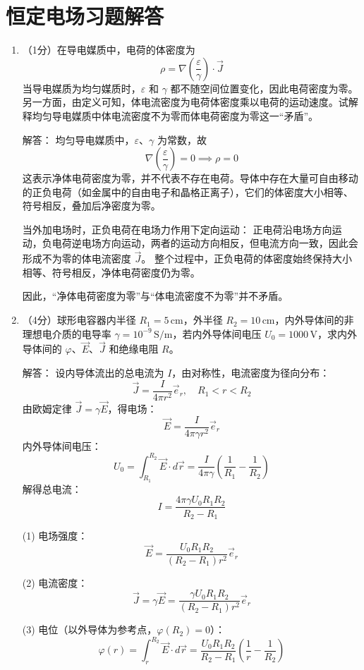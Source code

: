 \section{恒定电场习题解答}

\begin{enumerate}

\item （1分）在导电媒质中，电荷的体密度为
\[
\rho = \nabla\left(\frac{\varepsilon}{\gamma}\right)\cdot\vec{J}
\]
当导电媒质为均匀媒质时，$\varepsilon$ 和 $\gamma$ 都不随空间位置变化，因此电荷密度为零。另一方面，由定义可知，体电流密度为电荷体密度乘以电荷的运动速度。试解释均匀导电媒质中体电流密度不为零而体电荷密度为零这一“矛盾”。

解答：
均匀导电媒质中，$\varepsilon$、$\gamma$ 为常数，故
\[
\nabla\left(\frac{\varepsilon}{\gamma}\right)=0\implies\rho=0
\]
这表示净体电荷密度为零，并不代表不存在电荷。导体中存在大量可自由移动的正负电荷（如金属中的自由电子和晶格正离子），它们的体密度大小相等、符号相反，叠加后净密度为零。

当外加电场时，正负电荷在电场力作用下定向运动：
正电荷沿电场方向运动，负电荷逆电场方向运动，两者的运动方向相反，但电流方向一致，因此会形成不为零的体电流密度 $\vec{J}$。
整个过程中，正负电荷的体密度始终保持大小相等、符号相反，净体电荷密度仍为零。

因此，“净体电荷密度为零”与“体电流密度不为零”并不矛盾。

\item （4分）球形电容器内半径 $R_1=5\,\text{cm}$，外半径 $R_2=10\,\text{cm}$，内外导体间的非理想电介质的电导率 $\gamma=10^{-9}\,\text{S/m}$，若内外导体间电压 $U_0=1000\,\text{V}$，求内外导体间的 $\varphi$、$\vec{E}$、$\vec{J}$ 和绝缘电阻 $R$。

解答：
设内导体流出的总电流为 $I$，由对称性，电流密度为径向分布：
\[
\vec{J} = \frac{I}{4\pi r^2}\vec{e}_r,\quad R_1<r<R_2
\]
由欧姆定律 $\vec{J}=\gamma\vec{E}$，得电场：
\[
\vec{E} = \frac{I}{4\pi\gamma r^2}\vec{e}_r
\]
内外导体间电压：
\[
U_0 = \int_{R_1}^{R_2} \vec{E}\cdot d\vec{r} = \frac{I}{4\pi\gamma}\left(\frac{1}{R_1}-\frac{1}{R_2}\right)
\]
解得总电流：
\[
I = \frac{4\pi\gamma U_0 R_1 R_2}{R_2-R_1}
\]

(1) 电场强度：
\[
\vec{E} = \frac{U_0 R_1 R_2}{(R_2-R_1)r^2}\vec{e}_r
\]

(2) 电流密度：
\[
\vec{J} = \gamma\vec{E} = \frac{\gamma U_0 R_1 R_2}{(R_2-R_1)r^2}\vec{e}_r
\]

(3) 电位（以外导体为参考点，$\varphi(R_2)=0$）：
\[
\varphi(r) = \int_r^{R_2} \vec{E}\cdot d\vec{r} = \frac{U_0 R_1 R_2}{R_2-R_1}\left(\frac{1}{r}-\frac{1}{R_2}\right)
\]


\end{enumerate}
